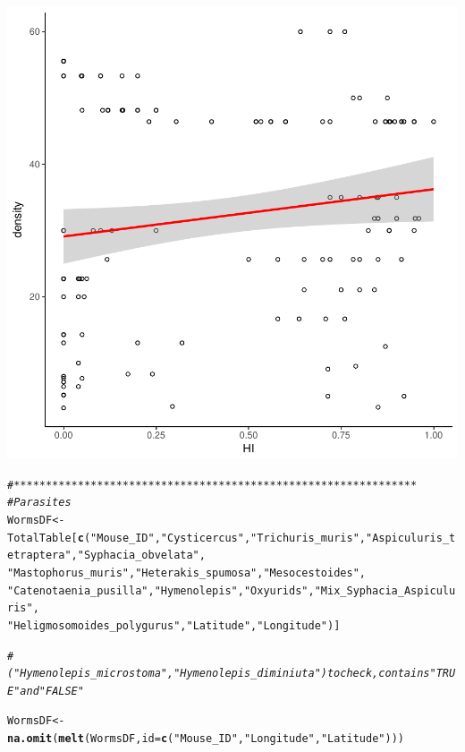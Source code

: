 \documentclass{article}\usepackage[]{graphicx}\usepackage[]{color}
\makeatletter
\newcommand{\hlstr}[1]{\textcolor[rgb]{0.192,0.494,0.8}{#1}}%
\newcommand{\hlcom}[1]{\textcolor[rgb]{0.678,0.584,0.686}{\textit{#1}}}%
\newcommand{\hlstd}[1]{\textcolor[rgb]{0.345,0.345,0.345}{#1}}%
\newcommand{\hlkwb}[1]{\textcolor[rgb]{0.69,0.353,0.396}{#1}}%
\newcommand{\hlkwc}[1]{\textcolor[rgb]{0.333,0.667,0.333}{#1}}%
\newcommand{\hlkwd}[1]{\textcolor[rgb]{0.737,0.353,0.396}{\textbf{#1}}}%
\newenvironment{kframe}{%
 \def\at@end@of@kframe{}%
 \ifinner\ifhmode%
  \def\at@end@of@kframe{\end{minipage}}%
  \begin{minipage}{\columnwidth}%
 \fi\fi%
 \def\FrameCommand##1{\hskip\@totalleftmargin \hskip-\fboxsep
 \colorbox{shadecolor}{##1}\hskip-\fboxsep
     \hskip-\linewidth \hskip-\@totalleftmargin \hskip\columnwidth}%
 \MakeFramed {\advance\hsize-\width
   \@totalleftmargin\z@ \linewidth\hsize
   \@setminipage}}%
 {\par\unskip\endMakeFramed%
 \at@end@of@kframe}
\newenvironment{knitrout}{}{} %
\makeatother
\begin{document}
\begin{knitrout}
\begin{kframe}
{\ttfamily\noindent\color{warningcolor}{\#\# Warning: Removed 542 rows containing non-finite values (stat\_smooth).}}

{\ttfamily\noindent\color{warningcolor}{\#\# Warning: Removed 542 rows containing missing values (geom\_point).}}\end{kframe}

{\centering \includegraphics[width=.6\linewidth]{figure/Data-Analysis-Alice-2017-Rnwauto-report-12} 

}


\begin{kframe}\begin{alltt}
\hlcom{# ***************************************************************}
\hlcom{# Parasites}
\hlstd{WormsDF} \hlkwb{<-} \hlstd{TotalTable[}\hlkwd{c}\hlstd{(}\hlstr{"Mouse_ID"}\hlstd{,} \hlstr{"Cysticercus"}\hlstd{,} \hlstr{"Trichuris_muris"}\hlstd{,} \hlstr{"Aspiculuris_tetraptera"}\hlstd{,} \hlstr{"Syphacia_obvelata"}\hlstd{,}
                        \hlstr{"Mastophorus_muris"}\hlstd{,} \hlstr{"Heterakis_spumosa"}\hlstd{,} \hlstr{"Mesocestoides"}\hlstd{,}
                        \hlstr{"Catenotaenia_pusilla"}\hlstd{,} \hlstr{"Hymenolepis"}\hlstd{,} \hlstr{"Oxyurids"}\hlstd{,} \hlstr{"Mix_Syphacia_Aspiculuris"}\hlstd{,}
                        \hlstr{"Heligmosomoides_polygurus"}\hlstd{,} \hlstr{"Latitude"}\hlstd{,} \hlstr{"Longitude"}\hlstd{)]}

\hlcom{# ("Hymenolepis_microstoma", "Hymenolepis_diminiuta") to check, contains "TRUE" and "FALSE"}

\hlstd{WormsDF} \hlkwb{<-} \hlkwd{na.omit}\hlstd{(}\hlkwd{melt}\hlstd{(WormsDF,} \hlkwc{id} \hlstd{=} \hlkwd{c}\hlstd{(}\hlstr{"Mouse_ID"}\hlstd{,} \hlstr{"Longitude"}\hlstd{,} \hlstr{"Latitude"}\hlstd{)))}


\end{alltt}
\end{kframe}
\end{knitrout}
\end{document}
